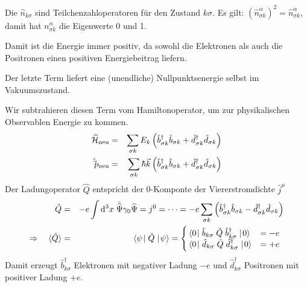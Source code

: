 Die $\hat n_{k\sigma}$ sind Teilchenzahloperatoren für den Zustand $k\sigma$. Es gilt: $(\hat n_{\sigma k}^\alpha)^2 = \hat n_{\sigma k}^\alpha$, damit hat $n_{\sigma k}^\alpha$ die Eigenwerte 0 und 1. 

Damit ist die Energie immer positiv, da sowohl die Elektronen als auch die Positronen einen positiven Energiebeitrag liefern.

Der letzte Term liefert eine (unendliche) Nullpunktsenergie selbst im Vakuumszustand.

Wir subtrahieren diesen Term vom Hamiltonoperator, um zur physikalischen Observablen Energie zu kommen.
\begin{eqnarray*}
\widehat{\mathcal H}_{\text{neu}} &=& \sum \limits_{\sigma k} E_{k} \left (\hat b_{\sigma k}^\dagger \hat b_{\sigma k}+\hat d_{\sigma k}^\dagger\hat d_{\sigma k}\right)\\
\hat\vec p_{\text{neu}} &=& \sum \limits_{\sigma k}\hbar \vec k \left(\hat b_{\sigma k}^\dagger \hat b_{\sigma k} + \hat d_{\sigma k}^\dagger \hat d_{\sigma k}\right)
\end{eqnarray*}
Der Ladungoperator $\hat Q$ entspricht der 0-Komponte der Viererstromdichte $\hat j^\mu$
\begin{eqnarray*}
\hat Q &=& -e \int \mathrm{d}^3x\; \bar{\wh\Psi}\gamma_0\wh\Psi = j^0 = \dots = -e \sum \limits_{\sigma k}\left(\hat b_{\sigma k}^\dagger \hat b_{\sigma k}-\hat d_{\sigma k}^\dagger \hat d_{\sigma k}\ri) 
\\
\Rightarrow\quad \langle\hat Q\rangle &=& \bra{\psi}{\hat Q}\ket{\psi} =  \Bigg{\{}\!\!\begin{array}{ll} \bra{0}\hat b_{k\sigma} \;\hat Q\; \hat b_{k\sigma}^\dagger\ket{0} & = -e  \\ \bra{0}\hat d_{k\sigma} \;\hat Q\; \hat d_{k\sigma}^\dagger\ket{0} & = +e  \end{array}
\end{eqnarray*}
Damit erzeugt $\hat b^\dagger_{k\sigma}$ Elektronen mit negativer Ladung $-e$ und $\hat d^\dagger_{k\sigma}$ Positronen mit positiver Ladung $+e$. 




